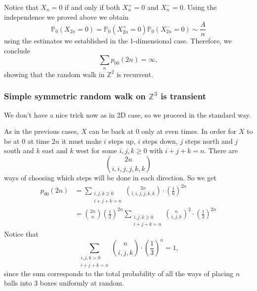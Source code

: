 \documentclass[a4paper]{article}
\begin{document}
Notice that $X_n=0$ if and only if both $X_n^{+}=0$ and $X_n^{-}=0$. Using the independence we proved above we obtain
\[
\mathbb{P}_0\left(X_{2 n}=0\right)=\mathbb{P}_0\left(X_{2 n}^{+}=0\right) \mathbb{P}_0\left(X_{2 n}^{-}=0\right) \sim \frac{A}{n}
\]
using the estimates we established in the 1-dimensional case. Therefore, we conclude
\[
\sum_n p_{00}(2 n)=\infty,
\]
showing that the random walk in $\mathbb{Z}^2$ is recurrent.

\subsubsection*{Simple symmetric random walk on $\mathbb{Z}^3$ is transient}

We don't have a nice trick now as in 2D case, so we proceed in the standard way. 

As in the previous cases, $X$ can be back at 0 only at even times. In order for $X$ to be at 0 at time $2 n$ it must make $i$ steps up, $i$ steps down, $j$ steps north and $j$ south and $k$ east and $k$ west for some $i, j, k \geq 0$ with $i+j+k=n$. There are 
\[
    \binom{2n}{i,i,j,j,k,k}
\]
 ways of choosing which steps will be done in each direction. So we get
\begin{align*}
    p_{00}(2 n)&=\sum_{\substack{i, j, k \geq 0 \\
    i+j+k=n}}\binom{2n}{i,i,j,j,k,k} \cdot\left(\frac{1}{6}\right)^{2 n}\\ 
    &=\binom{2n}{n}\left(\frac{1}{2}\right)^{2 n} \sum_{\substack{i, j, k \geq 0 \\
    i+j+k=n}}\binom{n}{i,j,k}^2 \cdot\left(\frac{1}{3}\right)^{2 n}
\end{align*}
Notice that
\[
\sum_{\substack{i, j, k>0 \\
i+j+k=n}}\binom{n}{i,j,k} \cdot\left(\frac{1}{3}\right)^n=1,
\]
since the sum corresponds to the total probability of all the ways of placing $n$ balls into 3 boxes uniformly at random. 
\end{document}
